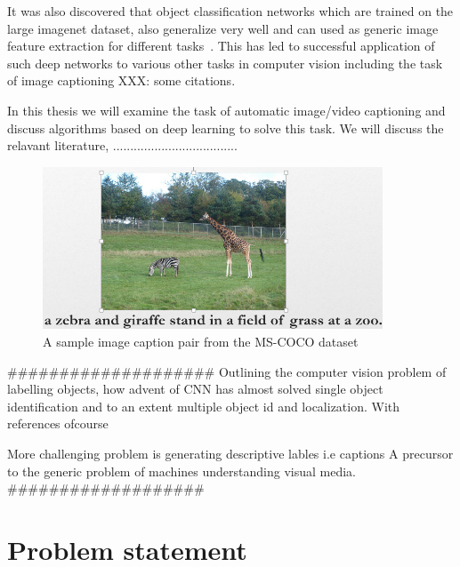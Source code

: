 It was also discovered that object classification networks which are trained on
the large imagenet dataset, also generalize very well and can used as generic
image feature extraction for different tasks~\cite{yosinski2014transferable}.
This has led to successful application of such deep networks to various other
tasks in computer vision including the task of image captioning XXX: some
citations.

In this thesis we will examine the task of automatic image/video captioning and
discuss algorithms based on deep learning to solve this task. We will discuss
the relavant literature, ....................................


\begin{figure}[h]
	\centering
	\includegraphics[width=0.9\textwidth]{./images/ExampleCaption.png}
	\caption{A sample image caption pair from the MS-COCO dataset}
	\label{fig:ExampleCap}
\end{figure}


####################
Outlining the computer vision problem of labelling objects, how advent of CNN
has almost solved single object identification and to an extent multiple object
id and localization. With references ofcourse

More challenging problem is generating descriptive lables i.e captions
A precursor to the generic problem of machines understanding visual media. 
###################


\section{Problem statement}

